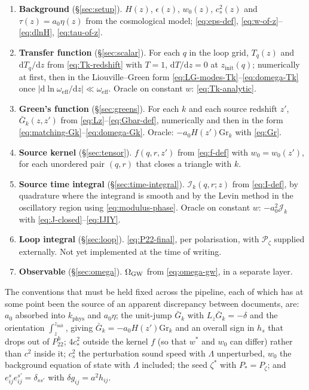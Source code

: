 \documentclass[11pt,a4paper]{article}
\newcommand{\cP}{\mathcal{P}}
\newcommand{\dd}{\mathrm{d}}
\newcommand{\Gr}{\mathrm{Gr}}
\newcommand{\Gb}{\bar{G}}
\newcommand{\zinit}{z_{\mathrm{init}}}
\newcommand{\wstar}{w^{*}}
\newcommand{\cstar}{c_{*}}
\newcommand{\om}{\omega_{\mathrm{eff}}}
\newcommand{\eps}{\epsilon}
\newcommand{\kphys}{k_{\mathrm{phys}}}
\theoremstyle{remark}
\begin{document}
\begin{enumerate}[label=\arabic*.,leftmargin=2em]
\item \textbf{Background} (\S\ref{sec:setup}). $H(z)$, $\eps(z)$, $w_0(z)$, $c_s^2(z)$ and $\tau(z) = a_0\eta(z)$ from the cosmological model; \eqref{eq:eps-def}, \eqref{eq:w-of-z}--\eqref{eq:dlnH}, \eqref{eq:tau-of-z}.
\item \textbf{Transfer function} (\S\ref{sec:scalar}). For each $q$ in the loop grid, $T_q(z)$ and $\dd T_q/\dd z$ from \eqref{eq:Tk-redshift} with $T=1$, $\dd T/\dd z=0$ at $\zinit(q)$; numerically at first, then in the Liouville--Green form \eqref{eq:LG-modes-Tk}--\eqref{eq:domega-Tk} once $|\dd\ln\om/\dd z|\ll\om$. Oracle on constant $w$: \eqref{eq:Tk-analytic}.
\item \textbf{Green's function} (\S\ref{sec:greens}). For each $k$ and each source redshift $z'$, $\Gb_k(z,z')$ from \eqref{eq:Lz}--\eqref{eq:Gbar-def}, numerically and then in the form \eqref{eq:matching-Gk}--\eqref{eq:domega-Gk}. Oracle: $-a_0H(z')\Gr_k$ with \eqref{eq:Gr}.
\item \textbf{Source kernel} (\S\ref{sec:tensor}). $f(q,r,z')$ from \eqref{eq:f-def} with $w_0 = w_0(z')$, for each unordered pair $(q,r)$ that closes a triangle with $k$.
\item \textbf{Source time integral} (\S\ref{sec:time-integral}). $\mathcal{I}_k(q,r;z)$ from \eqref{eq:I-def}, by quadrature where the integrand is smooth and by the Levin method in the oscillatory region using \eqref{eq:modulus-phase}. Oracle on constant $w$: $-a_0^2\mathcal{J}_k$ with \eqref{eq:J-closed}--\eqref{eq:IJIY}.
\item \textbf{Loop integral} (\S\ref{sec:loop}). \eqref{eq:P22-final}, per polarisation, with $\cP_\zeta$ supplied externally. Not yet implemented at the time of writing.
\item \textbf{Observable} (\S\ref{sec:omega}). $\Omega_{\rm GW}$ from \eqref{eq:omega-gw}, in a separate layer.
\end{enumerate}

\noindent The conventions that must be held fixed across the pipeline, each of which has at some point been the source of an apparent discrepancy between documents, are: $a_0$ absorbed into $\kphys$ and $a_0\eta$; the unit-jump $\Gb_k$ with $L_z\Gb_k = -\delta$ and the orientation $\int_z^{\zinit}$, giving $\Gb_k = -a_0H(z')\Gr_k$ and an overall sign in $h_s$ that drops out of $P^h_{22}$; $4\cstar^2$ outside the kernel $f$ (so that $\wstar$ and $w_0$ can differ) rather than $c^2$ inside it; $c_s^2$ the perturbation sound speed with $\Lambda$ unperturbed, $w_0$ the background equation of state with $\Lambda$ included; the seed $\zeta^*$ with $P_* = P_\zeta$; and $e^s_{ij}e^{s'}_{ij} = \delta_{ss'}$ with $\delta g_{ij} = a^2h_{ij}$.
\end{document}
